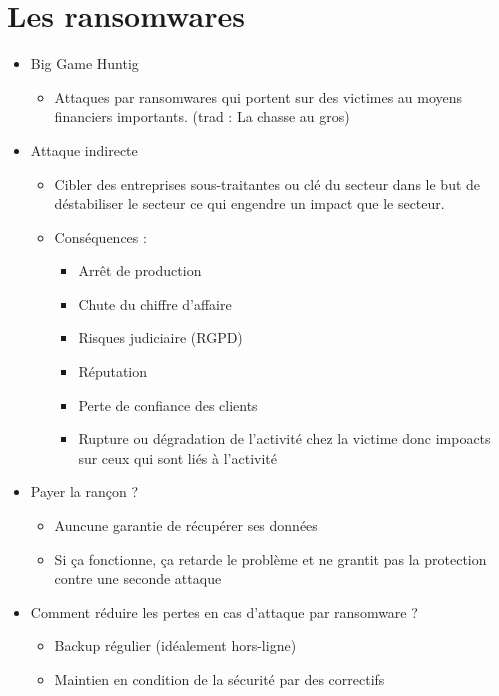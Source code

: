 \documentclass[a4paper]{article}
\begin{document}
  \section{Les ransomwares}
  \begin{itemize}[label=\textbullet, font=\Large]
    \item Big Game Huntig
    \begin{itemize}[label=, font=\scriptsize]
      \item Attaques par ransomwares qui portent sur des victimes au moyens financiers importants. (trad : La chasse au gros)
    \end{itemize}
    \item Attaque indirecte
    \begin{itemize}[label=, font=\scriptsize]
      \item Cibler des entreprises sous-traitantes ou clé du secteur dans le but de déstabiliser le secteur ce qui engendre un impact que le secteur.
      \item Conséquences :
      \begin{itemize}
        \item Arrêt de production
        \item Chute du chiffre d'affaire
        \item Risques judiciaire (RGPD)
        \item Réputation
        \item Perte de confiance des clients
        \item Rupture ou dégradation de l'activité chez la victime donc impoacts sur ceux qui sont liés à l'activité
      \end{itemize}
    \end{itemize}
    \item Payer la rançon ?
    \begin{itemize}[label=, font=\scriptsize]
      \item Auncune garantie de récupérer ses données
      \item Si ça fonctionne, ça retarde le problème et ne grantit pas la protection contre une seconde attaque
    \end{itemize}
    \item Comment réduire les pertes en cas d'attaque par ransomware ?
    \begin{itemize}[label=, font=\scriptsize]
      \item Backup régulier (idéalement hors-ligne)
      \item Maintien en condition de la sécurité par des correctifs

\end{itemize}
\end{itemize}
\end{document}
